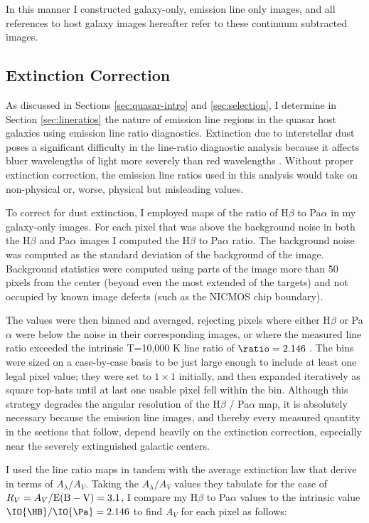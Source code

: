 In this manner I constructed galaxy-only, emission line only images, and all references to host galaxy images hereafter refer to these continuum subtracted images.


\subsection{Extinction Correction}
\label{sec:extinction}

As discussed in Sections \ref{sec:quasar-intro} and \ref{sec:selection}, I determine in Section \ref{sec:lineratios} the nature of emission line regions in the quasar host galaxies using emission line ratio diagnostics.  Extinction due to interstellar dust poses a significant difficulty in the line-ratio diagnostic analysis because it affects bluer wavelengths of light more severely than red wavelengths \citep{Osterbrock}.  Without proper extinction correction, the emission line ratios used in this analysis would take on non-physical or, worse, physical but misleading values.

To correct for dust extinction, I employed maps of the ratio of H$\beta$ to Pa$\alpha$ in my galaxy-only images. For each pixel that was above the background noise in both the H$\beta$ and Pa$\alpha$ images I computed the H$\beta$ to Pa$\alpha$ ratio. The background noise was computed as the standard deviation of the background of the image.  Background statistics were computed using parts of the image more than 50 pixels from the center (beyond even the most extended of the targets) and not occupied by known image defects (such as the NICMOS chip boundary).

The values were then binned and averaged, rejecting pixels where either H$\beta$ or Pa$\alpha$ were below the noise in their corresponding images, or where the measured line ratio exceeded the intrinsic T=10,000 K line ratio of $\ratio = 2.146$ \citep{Osterbrock}. The bins were sized on a case-by-case basis to be just large enough to include at least one legal pixel value; they were set to $1\times1$ initially, and then expanded iteratively as square top-hats until at last one usable pixel fell within the bin.  Although this strategy degrades the angular resolution of the H$\beta$ / Pa$\alpha$ map, it is absolutely necessary because the emission line images, and thereby every measured quantity in the sections that follow, depend heavily on the extinction correction, especially near the severely extinguished galactic centers.

I used the line ratio maps in tandem with the average extinction law that \cite{CCM} derive in terms of $A_\lambda/A_V$.  Taking the $A_\lambda/A_V$ values they tabulate for the case of ${R_V = A_V/\rm E(B-V) = 3.1}$, I compare my H$\beta$ to Pa$\alpha$ values to the intrinsic value  $\IO{\HB}/\IO{\Pa} = 2.146$ to find $A_V$ for each pixel as follows:

